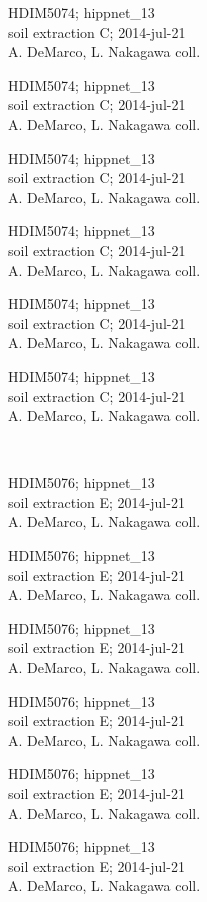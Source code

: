 \documentclass[2pt]{extarticle}
\begin{document}
\noindent
\parbox{0.16\textwidth}{\tiny \raggedright \rule[-0.3\baselineskip]{0pt}{10pt}HDIM5074; hippnet\_13\\ soil extraction C; 2014-jul-21\\ A. DeMarco, L. Nakagawa coll.}
\parbox{0.16\textwidth}{\tiny \raggedright \rule[-0.3\baselineskip]{0pt}{10pt}HDIM5074; hippnet\_13\\ soil extraction C; 2014-jul-21\\ A. DeMarco, L. Nakagawa coll.}
\parbox{0.16\textwidth}{\tiny \raggedright \rule[-0.3\baselineskip]{0pt}{10pt}HDIM5074; hippnet\_13\\ soil extraction C; 2014-jul-21\\ A. DeMarco, L. Nakagawa coll.}
\parbox{0.16\textwidth}{\tiny \raggedright \rule[-0.3\baselineskip]{0pt}{10pt}HDIM5074; hippnet\_13\\ soil extraction C; 2014-jul-21\\ A. DeMarco, L. Nakagawa coll.}
\parbox{0.16\textwidth}{\tiny \raggedright \rule[-0.3\baselineskip]{0pt}{10pt}HDIM5074; hippnet\_13\\ soil extraction C; 2014-jul-21\\ A. DeMarco, L. Nakagawa coll.}
\parbox{0.16\textwidth}{\tiny \raggedright \rule[-0.3\baselineskip]{0pt}{10pt}HDIM5074; hippnet\_13\\ soil extraction C; 2014-jul-21\\ A. DeMarco, L. Nakagawa coll.} \\ 
\vspace{0.001in} 

\noindent
\parbox{0.16\textwidth}{\tiny \raggedright \rule[-0.3\baselineskip]{0pt}{10pt}HDIM5076; hippnet\_13\\ soil extraction E; 2014-jul-21\\ A. DeMarco, L. Nakagawa coll.}
\parbox{0.16\textwidth}{\tiny \raggedright \rule[-0.3\baselineskip]{0pt}{10pt}HDIM5076; hippnet\_13\\ soil extraction E; 2014-jul-21\\ A. DeMarco, L. Nakagawa coll.}
\parbox{0.16\textwidth}{\tiny \raggedright \rule[-0.3\baselineskip]{0pt}{10pt}HDIM5076; hippnet\_13\\ soil extraction E; 2014-jul-21\\ A. DeMarco, L. Nakagawa coll.}
\parbox{0.16\textwidth}{\tiny \raggedright \rule[-0.3\baselineskip]{0pt}{10pt}HDIM5076; hippnet\_13\\ soil extraction E; 2014-jul-21\\ A. DeMarco, L. Nakagawa coll.}
\parbox{0.16\textwidth}{\tiny \raggedright \rule[-0.3\baselineskip]{0pt}{10pt}HDIM5076; hippnet\_13\\ soil extraction E; 2014-jul-21\\ A. DeMarco, L. Nakagawa coll.}
\parbox{0.16\textwidth}{\tiny \raggedright \rule[-0.3\baselineskip]{0pt}{10pt}HDIM5076; hippnet\_13\\ soil extraction E; 2014-jul-21\\ A. DeMarco, L. Nakagawa coll.} \\ 
\vspace{0.001in} 
\end{document}
